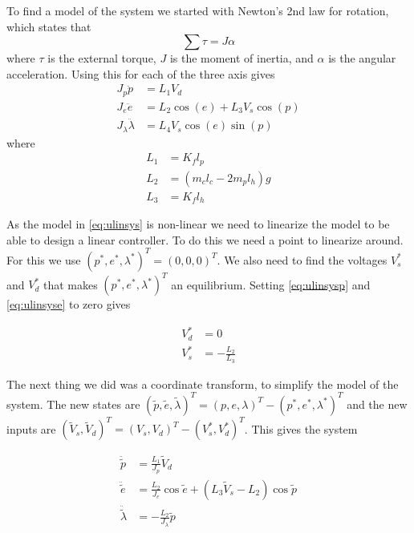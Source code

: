 To find a model of the system we started with Newton's 2nd law for rotation, which states that
\begin{equation} \label{eq:N2rot}
\sum \tau = J \alpha
\end{equation}
where $\tau$ is the external torque, $J$ is the moment of inertia, and $\alpha$ is the angular acceleration. Using this for each of the three axis gives
\begin{subequations}
  \begin{align}
    J_p\ddot{p} &= L_{1}V_{d} \label{eq:ulinsysp}\\
    J_e\ddot{e} &= L_{2} \cos(e) + L_3 V_s \cos(p) \label{eq:ulinsyse}\\
    J_\lambda \ddot{\lambda} &= L_4 V_s \cos(e) \sin(p) \label{eq:ulinsysl}
  \end{align}
  \label{eq:ulinsys}
\end{subequations}
where 
\begin{subequations}
	\begin{align*}
		L_1 &= K_f l_p\\
		L_2 &= (m_c l_c - 2 m_p l_h)g\\
		L_3 &= K_f l_h
	\end{align*}
\end{subequations}

As the model in \cref{eq:ulinsys} is non-linear we need to linearize the model to be able to design a linear controller. To do this we need a point to linearize around. For this we use $(p^*, e^*, \lambda^*)^T = (0, 0, 0)^T$. We also need to find the voltages $V_s^*$ and $V_d^*$ that makes $(p^*, e^*, \lambda^*)^T$ an equilibrium. Setting \cref{eq:ulinsysp} and \cref{eq:ulinsyse} to zero gives

\begin{subequations}
	\begin{align*}
		V_d^* &= 0\\
		V_s^* &= -\frac{L_2}{L_3}
	\end{align*}
\end{subequations}

The next thing we did was a coordinate transform, to simplify the model of the system. The new states are $ (\tilde p, \tilde e, \tilde \lambda)^T = (p, e, \lambda)^T - (p^*, e^*, \lambda^*)^T $ and the new inputs are $(\tilde V_s, \tilde V_d)^T = (V_s, V_d)^T - (V_s^*, V_d^*)^T $. This gives the system

\begin{subequations}
	\begin{align}
		\ddot{\tilde p} &= \frac{L_1}{J_p} \tilde V_d\\
		\ddot{\tilde e} &= \frac{L_2}{J_e} \cos \tilde e + (L_3 \tilde V_s - L_2) \cos \tilde p\\
		\ddot{\tilde \lambda} &= -\frac{L_2}{J_{\lambda}} \tilde p
	\end{align}
	\label{eq:transformertulinsys}
\end{subequations}



